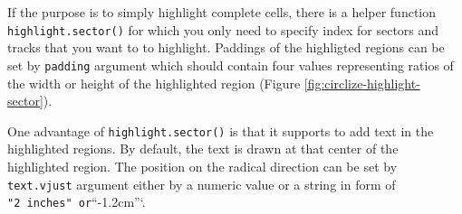 \documentclass[]{book}
\theoremstyle{definition}
\theoremstyle{definition}
\theoremstyle{remark}
\begin{document}
If the purpose is to simply highlight complete cells, there is a helper
function \texttt{highlight.sector()} for which you only need to specify
index for sectors and tracks that you want to to highlight. Paddings of
the highligted regions can be set by \texttt{padding} argument which
should contain four values representing ratios of the width or height of
the highlighted region (Figure \ref{fig:circlize-highlight-sector}).

One advantage of \texttt{highlight.sector()} is that it supports to add
text in the highlighted regions. By default, the text is drawn at that
center of the highlighted region. The position on the radical direction
can be set by \texttt{text.vjust} argument either by a numeric value or
a string in form of
\texttt{"2\ inches"\textasciigrave{}\textasciigrave{}\ or}``-1.2cm''`.
\end{document}
